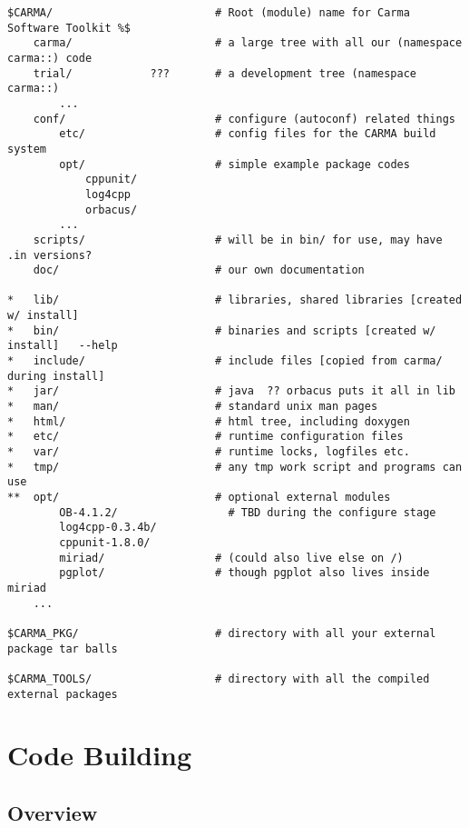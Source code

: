 \documentclass{article}
\begin{document}
\footnotesize
\begin{verbatim}
$CARMA/                         # Root (module) name for Carma Software Toolkit %$
    carma/                      # a large tree with all our (namespace carma::) code
    trial/            ???       # a development tree (namespace carma::)
        ...
    conf/                       # configure (autoconf) related things
        etc/                    # config files for the CARMA build system
        opt/                    # simple example package codes
            cppunit/
            log4cpp
            orbacus/
	    ...
    scripts/                    # will be in bin/ for use, may have .in versions?
    doc/                        # our own documentation 

*   lib/                        # libraries, shared libraries [created w/ install]
*   bin/                        # binaries and scripts [created w/ install]   --help 
*   include/                    # include files [copied from carma/ during install]
*   jar/                        # java  ?? orbacus puts it all in lib
*   man/                        # standard unix man pages
*   html/                       # html tree, including doxygen 
*   etc/                        # runtime configuration files
*   var/                        # runtime locks, logfiles etc.
*   tmp/                        # any tmp work script and programs can use
**  opt/                        # optional external modules 
        OB-4.1.2/                 # TBD during the configure stage
        log4cpp-0.3.4b/
        cppunit-1.8.0/
        miriad/                 # (could also live else on /)
        pgplot/                 # though pgplot also lives inside miriad
	...

$CARMA_PKG/                     # directory with all your external package tar balls 

$CARMA_TOOLS/                   # directory with all the compiled external packages 

\end{verbatim}
\normalsize

\newpage

\section{Code Building}

\subsection{Overview}
\end{document}
